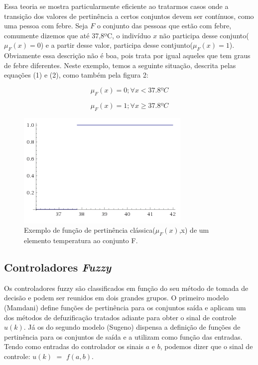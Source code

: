 \documentclass[
	twoside,				%
	twocolumn,				%
	english,				%
	brazil,					%
]{article}
\begin{document}
Essa teoria se mostra particularmente eficiente ao tratarmos casos onde a transição dos valores de pertinência a certos conjuntos devem ser contínuos, como uma pessoa com febre\cite{Meneghetti:2015}. Seja $F$ o conjunto das pessoas que estão com febre, comumente dizemos que até 37,8ºC, o indivíduo $x$ não participa desse conjunto($\mu_F(x) = 0$) e a partir desse valor, participa desse contjunto($\mu_F(x) = 1$). Obviamente essa descrição não é boa, pois trata por igual aqueles que tem graus de febre diferentes. Neste exemplo, temos a seguinte situação, descrita pelas equações (1) e (2), como também pela figura 2:

\begin{equation}
\mu_F(x) = 0; \forall x < 37.8 ºC
\end{equation}

\begin{equation}
\mu_F(x) = 1; \forall x \geq 37.8 ºC
\end{equation}

\begin{figure}[!ht]
    \centering
    \includegraphics[scale=0.7]{fp-classical.png}
    \caption { Exemplo de função de pertinência clássica($\mu_F(x)$,x) de um elemento temperatura ao conjunto F. }
\end{figure}


\subsection{Controladores \textit{Fuzzy}}

Os controladores fuzzy são classificados em função do seu método de tomada de decisão e podem ser reunidos em dois grandes grupos. O primeiro modelo (Mamdani) define funções de pertinência para os conjuntos saída e  aplicam um dos métodos de defuzificação tratados adiante para  obter o sinal de controle $u(k)$. Já os do segundo modelo (Sugeno) dispensa a definição de funções de pertinência para os conjuntos de saída e a utilizam como função das entradas. Tendo como entradas do controlador os sinais $a$ e $b$, podemos dizer que o sinal de controle: $u(k)$ $=$ $f(a,b)$.
\end{document}
